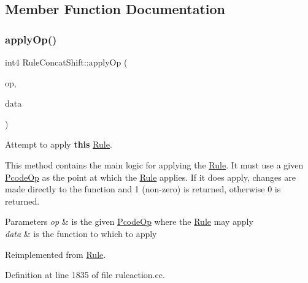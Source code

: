 \subsection{Member Function Documentation}
\mbox{\label{class_rule_concat_shift_a7954f9333718c1f1da94e117f1f5e9b1}} 
\subsubsection{\texorpdfstring{applyOp()}{applyOp()}}
{\footnotesize\ttfamily int4 Rule\+Concat\+Shift\+::apply\+Op (\begin{DoxyParamCaption}\item[{\mbox{\hyperlink{class_pcode_op}{Pcode\+Op}} $\ast$}]{op,  }\item[{\mbox{\hyperlink{class_funcdata}{Funcdata}} \&}]{data }\end{DoxyParamCaption})\hspace{0.3cm}{\ttfamily [virtual]}}



Attempt to apply {\bfseries{this}} \mbox{\hyperlink{class_rule}{Rule}}. 

This method contains the main logic for applying the \mbox{\hyperlink{class_rule}{Rule}}. It must use a given \mbox{\hyperlink{class_pcode_op}{Pcode\+Op}} as the point at which the \mbox{\hyperlink{class_rule}{Rule}} applies. If it does apply, changes are made directly to the function and 1 (non-\/zero) is returned, otherwise 0 is returned. 
\begin{DoxyParams}{Parameters}
{\em op} & is the given \mbox{\hyperlink{class_pcode_op}{Pcode\+Op}} where the \mbox{\hyperlink{class_rule}{Rule}} may apply \\
\hline
{\em data} & is the function to which to apply \\
\hline
\end{DoxyParams}


Reimplemented from \mbox{\hyperlink{class_rule_a4e3e61f066670175009f60fb9dc60848}{Rule}}.



Definition at line 1835 of file ruleaction.\+cc.

